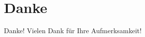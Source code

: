 \documentclass{beamer}
\begin{document}
\section*{Danke}
\begin{frame}{Danke!}
    \centering
    Vielen Dank für Ihre Aufmerksamkeit! \\
    \vspace{1cm}
   
\end{frame}
\end{document}
